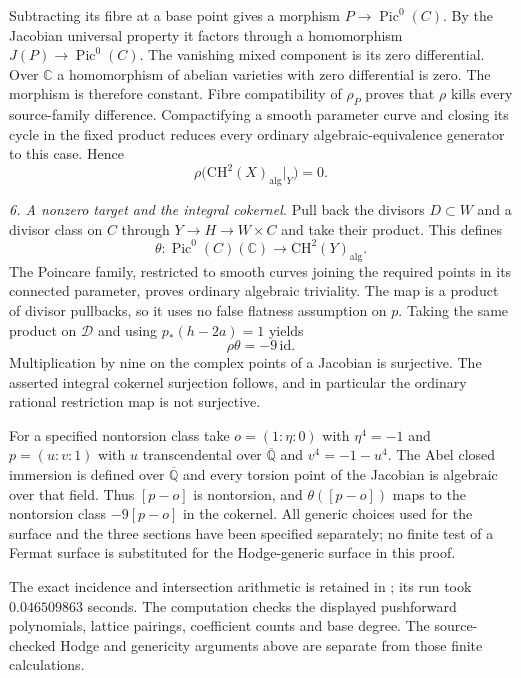 Subtracting its fibre at a base point gives a
morphism $P\to\operatorname{Pic}^0(C)$. By the
Jacobian universal property it factors through a
homomorphism $J(P)\to\operatorname{Pic}^0(C)$.
The vanishing mixed component is its zero differential.
Over $\mathbb C$ a homomorphism of abelian varieties
with zero differential is zero. The morphism is
therefore constant. Fibre compatibility of $\rho_P$
proves that $\rho$ kills every source-family difference.
Compactifying a smooth parameter curve and closing
its cycle in the fixed product reduces every ordinary
algebraic-equivalence generator to this case. Hence
\[
      \rho\bigl(\mathrm{CH}^2(X)_{\mathrm{alg}}|_Y\bigr)=0.
\]

\emph{6. A nonzero target and the integral cokernel.}
Pull back the divisors $D\subset W$ and a divisor
class on $C$ through $Y\to H\to W\times C$ and
take their product. This defines
\[
 \theta:\operatorname{Pic}^0(C)(\mathbb C)
                      \longrightarrow\mathrm{CH}^2(Y)_{\mathrm{alg}}.
\]
The Poincare family, restricted to smooth curves
joining the required points in its connected parameter,
proves ordinary algebraic triviality. The map is a
product of divisor pullbacks, so it uses no false
flatness assumption on $p$. Taking the same product
on $\mathcal D$ and using $p_*(h-2a)=1$ yields
\[
                              \rho\theta=-9\,\mathrm{id}.
\]
Multiplication by nine on the complex points of a
Jacobian is surjective. The asserted integral
cokernel surjection follows, and in particular the
ordinary rational restriction map is not surjective.

For a specified nontorsion class take
$o=(1:\eta:0)$ with $\eta^4=-1$ and
$p=(u:v:1)$ with $u$ transcendental over
$\overline{\mathbb Q}$ and $v^4=-1-u^4$.
The Abel closed immersion is defined over
$\overline{\mathbb Q}$ and every torsion point of
the Jacobian is algebraic over that field. Thus
$[p-o]$ is nontorsion, and $\theta([p-o])$ maps
to the nontorsion class $-9[p-o]$ in the cokernel.
All generic choices used for the surface and the
three sections have been specified separately; no
finite test of a Fermat surface is substituted for
the Hodge-generic surface in this proof.

The exact incidence and intersection arithmetic is retained in
; its run took
$0.046509863$ seconds. The computation checks the displayed pushforward
polynomials, lattice pairings, coefficient counts and base degree.
The source-checked Hodge and genericity arguments above are separate
from those finite calculations.
